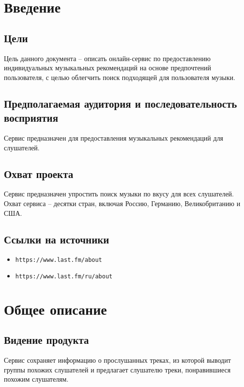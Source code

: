 \section{Введение}
\subsection{Цели}
Цель данного документа -- описать онлайн-сервис по предоставлению индивидуальных музыкальных рекомендаций
на основе предпочтений пользователя,
с целью облегчить поиск подходящей для пользователя музыки.


\subsection{Предполагаемая аудитория и последовательность восприятия}
Сервис предназначен для предоставления музыкальных рекомендаций для слушателей.

\subsection{Охват проекта}
Сервис предназначен упростить поиск музыки по вкусу для всех слушателей.
Охват сервиса -- десятки стран, включая Россию, Германию, Великобританию и США.

\subsection{Ссылки на источники}
\begin{itemize}
    \item \texttt{https://www.last.fm/about}
    \item \texttt{https://www.last.fm/ru/about}
\end{itemize}

\section{Общее описание}
\subsection{Видение продукта}
Сервис сохраняет информацию о прослушанных треках,
из которой выводит группы похожих слушателей
и предлагает слушателю треки, понравившиеся похожим слушателям.

